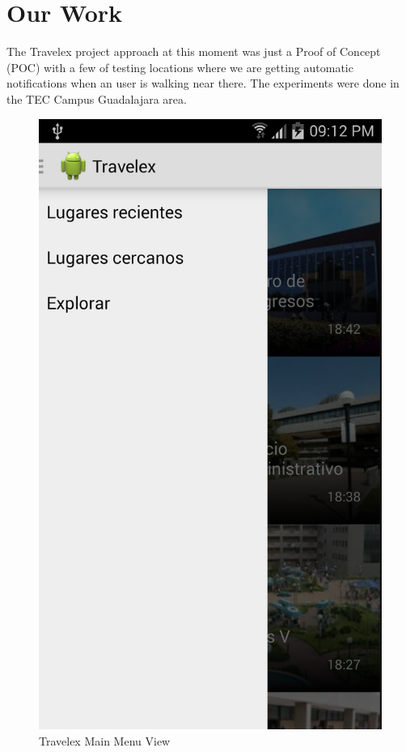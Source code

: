 \section{Our Work}
The Travelex project approach at this moment was just a Proof of Concept (POC) with a 
few of testing locations where we are getting automatic notifications when an user 
is walking near there. The experiments were done in the TEC Campus Guadalajara area. \\

\begin{figure}[ht]
  \centering
  \includegraphics[scale=0.08]{travelex_menu}
  \caption{Travelex Main Menu View}
  \label{fig_menu}
\end{figure}

